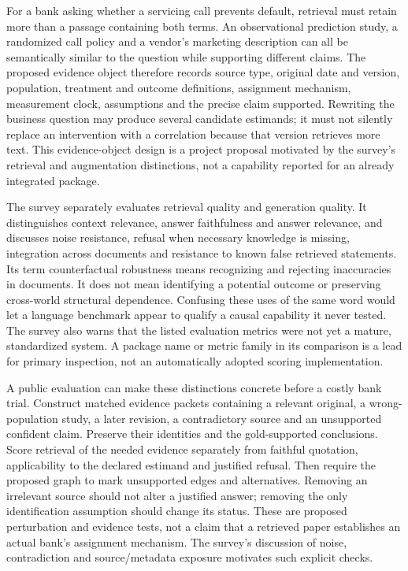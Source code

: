 For a bank asking whether a servicing call prevents default, retrieval must
retain more than a passage containing both terms. An observational prediction
study, a randomized call policy and a vendor's marketing description can all
be semantically similar to the question while supporting different claims.
The proposed evidence object therefore records source type, original date and
version, population, treatment and outcome definitions, assignment mechanism,
measurement clock, assumptions and the precise claim supported. Rewriting the
business question may produce several candidate estimands; it must not silently
replace an intervention with a correlation because that version retrieves more
text. This evidence-object design is a project proposal motivated by the survey's
retrieval and augmentation distinctions, not a capability reported for an
already integrated package.
\citep{exec19_rag_survey}

The survey separately evaluates retrieval quality and generation quality.
It distinguishes context relevance, answer faithfulness and answer relevance,
and discusses noise resistance, refusal when necessary knowledge is missing,
integration across documents and resistance to known false retrieved statements.
Its term counterfactual robustness means recognizing and rejecting inaccuracies
in documents. It does not mean identifying a potential outcome or preserving
cross-world structural dependence. Confusing these uses of the same word would
let a language benchmark appear to qualify a causal capability it never tested.
The survey also warns that the listed evaluation metrics were not yet a mature,
standardized system. A package name or metric family in its comparison is a
lead for primary inspection, not an automatically adopted scoring implementation.
\citep{exec19_rag_survey}

A public evaluation can make these distinctions concrete before a costly bank
trial. Construct matched evidence packets containing a relevant original,
a wrong-population study, a later revision, a contradictory source and an
unsupported confident claim. Preserve their identities and the gold-supported
conclusions. Score retrieval of the needed evidence separately from faithful
quotation, applicability to the declared estimand and justified refusal.
Then require the proposed graph to mark unsupported edges and alternatives.
Removing an irrelevant source should not alter a justified answer; removing
the only identification assumption should change its status. These are proposed
perturbation and evidence tests, not a claim that a retrieved paper establishes
an actual bank's assignment mechanism. The survey's discussion of noise,
contradiction and source/metadata exposure motivates such explicit checks.
\citep{exec19_rag_survey}

